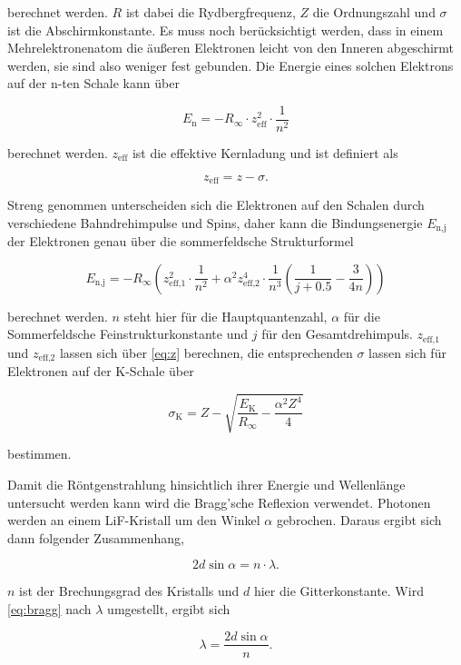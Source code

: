berechnet werden.
$R$ ist dabei die Rydbergfrequenz, $Z$ die Ordnungszahl und $\sigma$ ist die Abschirmkonstante.
Es muss noch berücksichtigt werden, dass in einem Mehrelektronenatom die äußeren Elektronen leicht von den Inneren abgeschirmt werden, sie sind also weniger fest gebunden.
Die Energie eines solchen Elektrons auf der n-ten Schale kann über 

\begin{equation}
    E_\text{n} = - R_\infty \cdot z_\text{eff}^2 \cdot \frac{1}{n^2}
    \label{eq:en}
\end{equation}

berechnet werden.
$z_\text{eff}$ ist die effektive Kernladung und ist definiert als

\begin{equation}
    z_\text{eff} = z - \sigma.
    \label{eq:z}
\end{equation}

Streng genommen unterscheiden sich die Elektronen auf den Schalen durch verschiedene Bahndrehimpulse und Spins, daher kann die Bindungsenergie $E_\text{n,j}$ der Elektronen genau über die sommerfeldsche Strukturformel

\begin{equation}
    E_\text{n,j} = - R_\infty \left(z_\text{eff,1}^2 \cdot \frac{1}{n^2} + \alpha ^2 z_\text{eff,2}^4  \cdot \frac{1}{n^3} \left(\frac{1}{j + 0.5} - \frac{3}{4 n}   \right)\right)
    \label{eq:sommerfeld}
\end{equation}

berechnet werden.
$n$ steht hier für die Hauptquantenzahl, $\alpha$ für die Sommerfeldsche Feinstrukturkonstante und $j$ für den Gesamtdrehimpuls.
$z_\text{eff,1}$ und $z_\text{eff,2}$ lassen sich über \eqref{eq:z} berechnen, die entsprechenden $\sigma$ lassen sich für Elektronen auf der K-Schale über 

\begin{equation}
    \sigma _\text{K} = Z - \sqrt{\frac{E_\text{K}}{R_\infty} - \frac{\alpha ^2 Z^4}{4}}
    \label{eq:sigma}
\end{equation}

bestimmen.

Damit die Röntgenstrahlung hinsichtlich ihrer Energie und Wellenlänge untersucht werden kann wird die Bragg'sche Reflexion verwendet.
Photonen werden an einem LiF-Kristall um den Winkel $\alpha$ gebrochen.
Daraus ergibt sich dann folgender Zusammenhang,

\begin{equation}
    2 d \sin{\alpha} = n \cdot \lambda.
    \label{eq:bragg}
\end{equation}

$n$ ist der Brechungsgrad des Kristalls und $d$ hier die Gitterkonstante.
Wird \eqref{eq:bragg} nach $\lambda$ umgestellt, ergibt sich 

\begin{equation}
   \lambda = \frac{2 d \sin{\alpha}}{n}.
   \label{eq:lambda}
\end{equation}